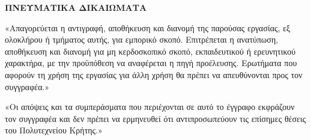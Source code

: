 \documentclass[
	12pt, %
	oneside, %
	greek,
	onehalfspacing, %
	liststotoc, %
	toctotoc, %
	parskip, %
	headsepline, %
]{MastersDoctoralThesis} %
\begin{document}

\thispagestyle{empty}
\vspace*{\fill}

\noindent\textbf{ΠΝΕΥΜΑΤΙΚΑ ΔΙΚΑΙΩΜΑΤΑ}

\vspace{0.5cm}

\noindent«Απαγορεύεται η αντιγραφή, αποθήκευση και διανομή της παρούσας εργασίας, εξ ολοκλήρου ή τμήματος αυτής, για εμπορικό σκοπό. Επιτρέπεται η ανατύπωση, αποθήκευση και διανομή για μη κερδοσκοπικό σκοπό, εκπαιδευτικού ή ερευνητικού χαρακτήρα, με την προϋπόθεση να αναφέρεται η πηγή προέλευσης. Ερωτήματα που αφορούν τη χρήση της εργασίας για άλλη χρήση θα πρέπει να απευθύνονται προς τον συγγραφέα.»

\vspace{0.3cm}

\noindent«Οι απόψεις και τα συμπεράσματα που περιέχονται σε αυτό το έγγραφο εκφράζουν τον συγγραφέα και δεν πρέπει να ερμηνευθεί ότι αντιπροσωπεύουν τις επίσημες θέσεις του Πολυτεχνείου Κρήτης.»

\vspace*{\fill}
\clearpage

\end{document}
